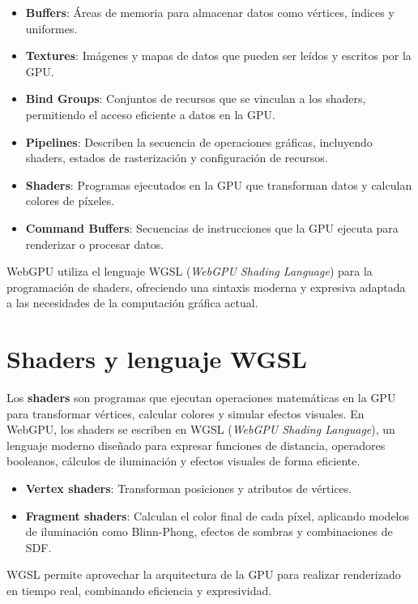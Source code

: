 \begin{itemize}
    \item \textbf{Buffers}: Áreas de memoria para almacenar datos como vértices, índices y uniformes.
    \item \textbf{Textures}: Imágenes y mapas de datos que pueden ser leídos y escritos por la GPU.
    \item \textbf{Bind Groups}: Conjuntos de recursos que se vinculan a los shaders, permitiendo el acceso eficiente a datos en la GPU.
    \item \textbf{Pipelines}: Describen la secuencia de operaciones gráficas, incluyendo shaders, estados de rasterización y configuración de recursos.
    \item \textbf{Shaders}: Programas ejecutados en la GPU que transforman datos y calculan colores de píxeles.
    \item \textbf{Command Buffers}: Secuencias de instrucciones que la GPU ejecuta para renderizar o procesar datos.
\end{itemize}

WebGPU utiliza el lenguaje WGSL (\textit{WebGPU Shading Language}) para la
programación de shaders, ofreciendo una sintaxis moderna y expresiva adaptada a
las necesidades de la computación gráfica actual.

\section{Shaders y lenguaje WGSL}

Los \textbf{shaders} son programas que ejecutan operaciones matemáticas en la
GPU para transformar vértices, calcular colores y simular efectos visuales. En
WebGPU, los shaders se escriben en WGSL (\textit{WebGPU Shading Language}), un
lenguaje moderno diseñado para expresar funciones de distancia, operadores
booleanos, cálculos de iluminación y efectos visuales de forma eficiente.

\begin{itemize}
    \item \textbf{Vertex shaders}: Transforman posiciones y atributos de vértices.
    \item \textbf{Fragment shaders}: Calculan el color final de cada píxel, aplicando modelos de iluminación como Blinn-Phong, efectos de sombras y combinaciones de SDF.
\end{itemize}

WGSL permite aprovechar la arquitectura de la GPU para realizar renderizado en
tiempo real, combinando eficiencia y expresividad.


